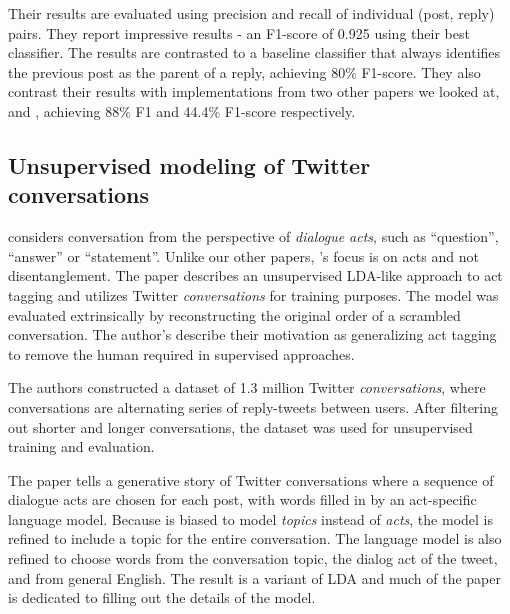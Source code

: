 \documentclass{article}
\begin{document}
Their results are evaluated using precision and recall of individual
(post, reply) pairs. They report impressive results - an F1-score of 0.925 using their best
classifier. The results are contrasted to a baseline classifier that always
identifies the previous post as the parent of a reply, achieving 80\% F1-score. 
They also contrast their results with implementations from two other papers we looked at,
\cite{Elsner2008a} and \cite{Wang2008a}, achieving 88\% F1 and 44.4\% F1-score
respectively.

\subsection{Unsupervised modeling of Twitter conversations}
\cite{Ritter2010a} considers conversation from the perspective of 
\textit{dialogue acts}, such as ``question'', ``answer'' or ``statement''. Unlike our other papers,
\cite{Ritter2010a}'s focus is on acts and not disentanglement. The paper describes
an unsupervised LDA-like approach to act tagging and utilizes Twitter \textit{conversations} for
training purposes. The model was evaluated extrinsically by reconstructing 
the original order of a scrambled conversation. The author's describe their motivation as
generalizing act tagging to remove the human required in supervised approaches. 

The authors constructed a dataset of 1.3 million Twitter \textit{conversations}, 
where conversations are alternating series of reply-tweets between users. After filtering out shorter 
and longer conversations, the dataset was used for unsupervised training and evaluation.

The paper tells a generative story of Twitter conversations where a sequence of dialogue
acts are chosen for each post, with words filled in by an act-specific language model.
Because is biased to model \textit{topics}
instead of \textit{acts}, the model is refined to include a topic 
for the entire conversation. The language model is also refined to choose words from
the conversation topic, the dialog act of the tweet, and from general English. The result
is a variant of LDA and much of the paper is dedicated to filling out the details of the model.
\end{document}
